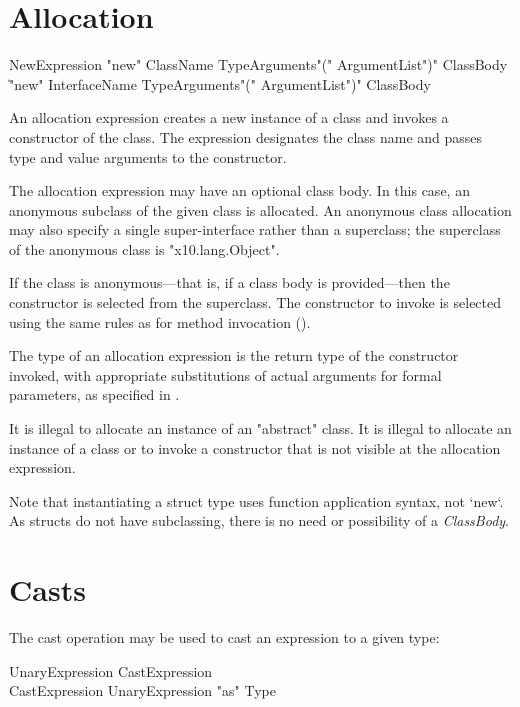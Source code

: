\section{Allocation}
\label{ClassCreation}

\begin{grammar}
NewExpression \: \xcd"new" ClassName TypeArguments\opt \xcd"(" ArgumentList\opt \xcd")"
        ClassBody\opt \\
  \| \xcd"new" InterfaceName TypeArguments\opt \xcd"(" ArgumentList\opt \xcd")"
        ClassBody
\end{grammar}

An allocation expression creates a new instance of a class and
invokes a constructor of the class.
The expression designates the class name and passes
type and value arguments to the constructor.

The allocation expression may have an optional class body.
In this case, an anonymous subclass of the given class is
allocated.   An anonymous class allocation may also specify a
single super-interface rather than a superclass; the superclass
of the anonymous class is \xcd"x10.lang.Object".

If the class is anonymous---that is, if a class body is
provided---then the constructor is selected from the superclass.
The constructor to invoke is selected using the same rules as
for method invocation ().

The type of an allocation expression
is the return type of the constructor invoked, with appropriate
substitutions  of actual arguments for formal parameters, as
specified in .

It is illegal to allocate an instance of an \xcd"abstract" class.
It is illegal to allocate an instance of a class or to invoke a
constructor that is not visible at
the allocation expression.

Note that instantiating a struct type uses function application syntax, not
\xcd`new`.  As structs do not have subclassing, there is no need or
possibility of a {\em ClassBody}.


\section{Casts}\label{ClassCast}

The cast operation may be used to cast an expression to a given type:

\begin{grammar}
UnaryExpression \: CastExpression \\
CastExpression \: UnaryExpression \xcd"as" Type \\
\end{grammar}

